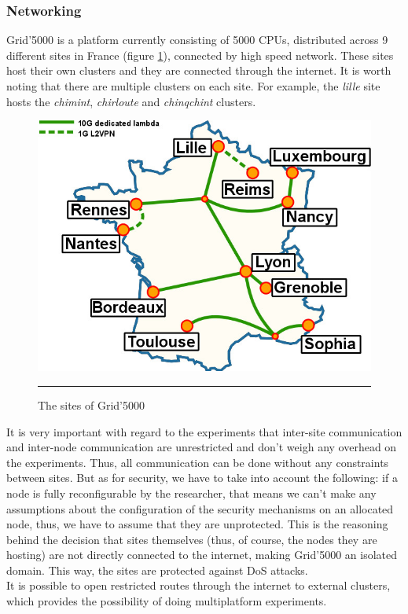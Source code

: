 \subsubsection{Networking}
Grid'5000 is a platform currently consisting of 5000 CPUs, distributed
across 9 different sites in France (figure \ref{fig:g5ksites}),
connected by high speed network. These sites host their own clusters
and they are connected through the internet. It is worth noting that
there are multiple clusters on each site. For example, the
\emph{lille} site hosts the \emph{chimint}, \emph{chirloute} and
\emph{chinqchint} clusters.
\begin{figure}[htbp]
  \centering
    \includegraphics[scale=2]{./Figures/Renater5-g5k.jpg}
    \rule{35em}{0.5pt}
  \caption[Grid'5000 sites]{The sites of Grid'5000}
  \label{fig:g5ksites}
\end{figure}
It is very important with regard to the
experiments that inter-site communication and inter-node communication
are unrestricted and don't weigh any overhead on the
experiments. Thus, all communication can be done without any
constraints between sites. But
as for security, we have to take into account the following: if a
node is fully reconfigurable by the researcher, that means we
can't make any assumptions about the configuration of the security
mechanisms on an allocated node, thus, we have to assume that they are
unprotected. This is the reasoning behind the decision that sites
themselves (thus, of course, the nodes they are hosting) are not
directly connected to the internet, making Grid'5000 an isolated
domain. This way, the sites are protected against DoS attacks.\\[0.3cm]
It is possible to open restricted routes through the internet to
external clusters, which provides the possibility of doing
multiplatform experiments.
